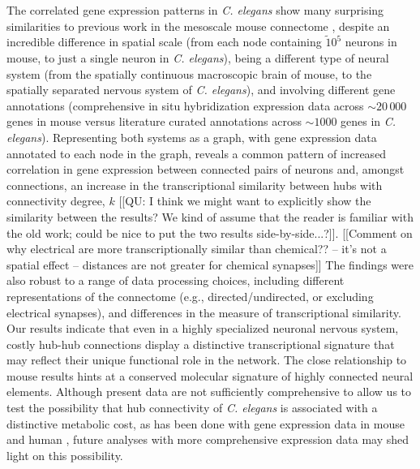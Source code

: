 \documentclass[10pt,letterpaper]{article}
\begin{document}
{%
The correlated gene expression patterns in \emph{C. elegans} show many surprising similarities to previous work in the mesoscale mouse connectome \cite{Fulcher:2016ck}, despite an incredible difference in spatial scale (from each node containing $\tilde 10^5$ neurons in mouse, to just a single neuron in \emph{C. elegans}), being a different type of neural system (from the spatially continuous macroscopic brain of mouse, to the spatially separated nervous system of \emph{C. elegans}), and involving different gene annotations (comprehensive in situ hybridization expression data across $\sim20\,000$ genes in mouse versus literature curated annotations across $\sim 1000$ genes in \emph{C. elegans}).
Representing both systems as a graph, with gene expression data annotated to each node in the graph, reveals a common pattern of increased correlation in gene expression between connected pairs of neurons and, amongst connections, an increase in the transcriptional similarity between hubs with connectivity degree, $k$ [[QU: I think we might want to explicitly show the similarity between the results? We kind of assume that the reader is familiar with the old work; could be nice to put the two results side-by-side...?]].
[[Comment on why electrical are more transcriptionally similar than chemical?? -- it's not a spatial effect -- distances are not greater for chemical synapses]]
The findings were also robust to a range of data processing choices, including different representations of the connectome (e.g., directed/undirected, or excluding electrical synapses), and differences in the measure of transcriptional similarity.
Our results indicate that even in a highly specialized neuronal nervous system, costly hub-hub connections display a distinctive transcriptional signature that may reflect their unique functional role in the network.
The close relationship to mouse results hints at a conserved molecular signature of highly connected neural elements.
Although present data are not sufficiently comprehensive to allow us to test the possibility that hub connectivity of \emph{C. elegans} is associated with a distinctive metabolic cost, as has been done with gene expression data in mouse \cite{Fulcher:2016ck} and human \cite{Vertes2016a}, future analyses with more comprehensive expression data may shed light on this possibility.


}
\end{document}
